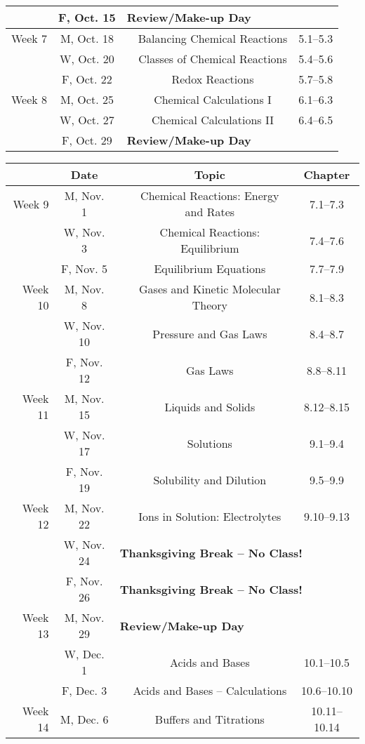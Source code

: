 \documentclass[12pt, letterpaper]{article}
\begin{document}
\begin{tabular}{rcccc}
	& F, Oct. 15& \multicolumn{3}{l}{\textbf{Review/Make-up Day}}\\
	\midrule
	Week 7 & M, Oct. 18&& Balancing Chemical Reactions & 5.1--5.3\\
	& W, Oct. 20&& Classes of Chemical Reactions & 5.4--5.6\\
	& F, Oct. 22&& Redox Reactions & 5.7--5.8\\
	\midrule
	Week 8 & M, Oct. 25&& Chemical Calculations I & 6.1--6.3\\
	& W, Oct. 27&& Chemical Calculations II & 6.4--6.5\\
	& F, Oct. 29& \multicolumn{3}{l}{\textbf{Review/Make-up Day}}\\
\end{tabular}

\begin{tabular}{rcccc}
	& Date && Topic & Chapter\\
	\midrule
	Week 9 & M, Nov. 1&& Chemical Reactions: Energy and Rates & 7.1--7.3\\
	& W, Nov. 3&& Chemical Reactions: Equilibrium & 7.4--7.6\\
	& F, Nov. 5&& Equilibrium Equations & 7.7--7.9\\
	\midrule
	Week 10 & M, Nov. 8&& Gases and Kinetic Molecular Theory & 8.1--8.3\\
	& W, Nov. 10&& Pressure and Gas Laws & 8.4--8.7\\
	& F, Nov. 12&& Gas Laws & 8.8--8.11\\
	\midrule
	Week 11 & M, Nov. 15&& Liquids and Solids & 8.12--8.15\\
	& W, Nov. 17&& Solutions & 9.1--9.4\\
	& F, Nov. 19&& Solubility and Dilution & 9.5--9.9\\
	\midrule
	Week 12 & M, Nov. 22&& Ions in Solution: Electrolytes & 9.10--9.13\\
	& W, Nov. 24& \multicolumn{3}{l}{\textbf{Thanksgiving Break -- No Class!}}\\
	& F, Nov. 26& \multicolumn{3}{l}{\textbf{Thanksgiving Break -- No Class!}}\\
	\midrule
	Week 13 & M, Nov. 29& \multicolumn{3}{l}{\textbf{Review/Make-up Day}}\\
	& W, Dec. 1&& Acids and Bases & 10.1--10.5\\
	& F, Dec. 3&& Acids and Bases -- Calculations & 10.6--10.10\\
	\midrule
	Week 14 & M, Dec. 6&& Buffers and Titrations & 10.11--10.14\\

\end{tabular}
\end{document}
